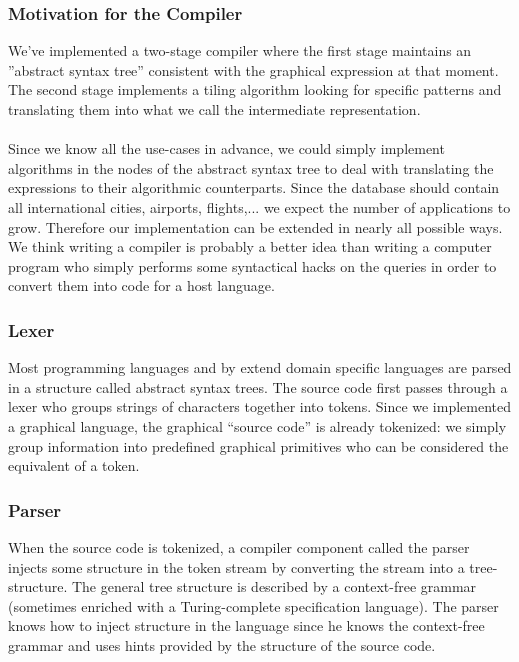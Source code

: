 \subsubsection{Motivation for the Compiler}
\label{sssection:motivation_for_the_compiler}
We've implemented a two-stage compiler where the first stage maintains an
''abstract syntax tree'' consistent with the graphical expression at that
moment. The second stage implements a tiling algorithm looking for specific
patterns and translating them into what we call the intermediate representation.
\paragraph{}
Since we know all the use-cases in advance, we could simply implement
algorithms in the nodes of the abstract syntax tree to deal with translating
the expressions to their algorithmic counterparts. Since the database should
contain all international cities, airports, flights,... we expect the number of
applications to grow. Therefore our implementation can be extended in nearly
all possible ways. We think writing a compiler is probably a better idea than
writing a computer program who simply performs some syntactical hacks on the
queries in order to convert them into code for a host language.
\subsubsection{Lexer}
Most programming languages and by extend domain specific languages are parsed
in a structure called abstract syntax trees. The source code first passes
through a lexer who groups strings of characters together into tokens. Since we
implemented a graphical language, the graphical ``source code'' is already
tokenized: we simply group information into predefined graphical primitives who
can be considered the equivalent of a token.
\subsubsection{Parser}
When the source code is tokenized, a compiler component called the parser
injects some structure in the token stream by converting the stream into a
tree-structure. The general tree structure is described by a context-free
grammar (sometimes enriched with a Turing-complete specification language). The
parser knows how to inject structure in the language since he knows the
context-free grammar and uses hints provided by the structure of the source
code.
